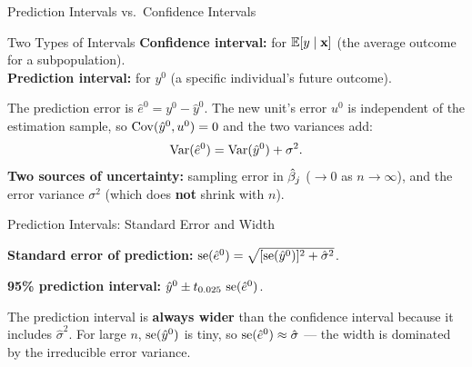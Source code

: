\documentclass[aspectratio=169, 12pt]{beamer}
\begin{document}
\begin{frame}{Prediction Intervals vs.\ Confidence Intervals}

  \begin{definitionbox}{Two Types of Intervals}
    \textbf{Confidence interval:} for $\operatorname{\mathbb{E}}[y \mid \mathbf{x}]$ (the average outcome for a
    subpopulation). \\[4pt]
    \textbf{Prediction interval:} for $y^0$ (a specific individual's future outcome).
  \end{definitionbox}

  \medskip

  The prediction error is $\hat{e}^0 = y^0 - \hat{y}^0$. The new unit's error $u^0$ is
  independent of the estimation sample, so $\operatorname{Cov}(\hat{y}^0, u^0)=0$ and the two variances
  add:
  \[
    \operatorname{Var}(\hat{e}^0) = \operatorname{Var}(\hat{y}^0) + \sigma^2 .
  \]
  \textbf{Two sources of uncertainty:} sampling error in $\hat{\beta}_j$ ($\to 0$ as
  $n\to\infty$), and the error variance $\sigma^2$ (which does \textbf{not} shrink with
  $n$).

\end{frame}

\begin{frame}{Prediction Intervals: Standard Error and Width}

  \begin{keybox}
    \textbf{Standard error of prediction:}
    $\operatorname{se}(\hat{e}^0) = \sqrt{[\operatorname{se}(\hat{y}^0)]^2 + \hat\sigma^2}$.

    \smallskip
    \textbf{95\% prediction interval:}
    $\hat{y}^0 \pm t_{0.025}\,\operatorname{se}(\hat{e}^0)$.
  \end{keybox}

  \medskip

  \begin{highlightbox}
    The prediction interval is \textbf{always wider} than the confidence interval because
    it includes $\hat\sigma^2$. For large $n$, $\operatorname{se}(\hat{y}^0)$ is tiny, so
    $\operatorname{se}(\hat{e}^0) \approx \hat\sigma$ --- the width is dominated by the irreducible
    error variance.
  \end{highlightbox}

\end{frame}
\end{document}
